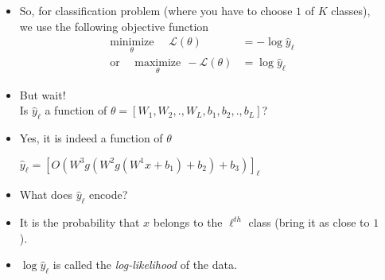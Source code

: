 \begin{frame}
  \begin{columns}
    \begin{overlayarea}{\textwidth}{\textheight}
      \vspace{0.3cm}
      \makebox[\textwidth][c]{\usebox{\nncontent}}
    \end{overlayarea}

    \begin{overlayarea}{\textwidth}{\textheight}
      \begin{itemize}[<+->]
      \justifying
        \item So, for classification problem (where you have to choose $1$ of $K$ classes), we use the following objective function
          \begin{align*}
                        \underset{\theta}{\text{minimize}} ~~~~~~\mathscr{L}(\theta) &= -\log \hat{y}_{\ell} \\ %
              \text{or}~~~~~~\underset{\theta}{\text{maximize}} ~~ -\mathscr{L}(\theta) &=  \log \hat{y}_{\ell}    %
          \end{align*}
        \item But wait! \\
            Is $\hat{y}_\ell$ a function of $\theta=[W_1,W_2,.,W_L,b_1,b_2,.,b_L]$?
        \item Yes, it is indeed a function of $\theta$
          \begin{center}
            $ \hat y_\ell = [O(W^{3}g(W^{2}g(W^{1}x+b_{1})+b_{2})+b_{3})]_\ell $
          \end{center}
        \item What does $\hat{y}_\ell$ encode? 
        \item It is the probability that $x$ belongs to the $\ell^{th}$ class (bring it as close to $1$).
        \item $\log \hat{y}_\ell$ is called the \textit{log-likelihood} of the data.
      \end{itemize}
    \end{overlayarea}
  \end{columns}
\end{frame}

